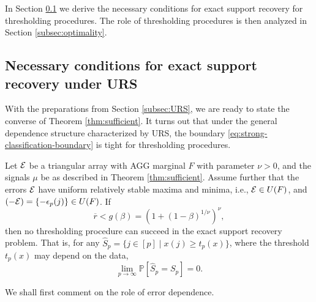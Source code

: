 
In Section \ref{subsec:necessary} we derive the necessary conditions for exact support recovery for thresholding procedures. 
The role of thresholding procedures is then analyzed in Section \ref{subsec:optimality}. 

\subsection{Necessary conditions for exact support recovery under URS}
\label{subsec:necessary}

With the preparations from Section \ref{subsec:URS}, we are ready to state the converse of Theorem \ref{thm:sufficient}.
It turns out that under the general dependence structure characterized by URS, the boundary \eqref{eq:strong-classification-boundary} is tight for thresholding procedures.

\begin{theorem} \label{thm:necessary}
    Let ${\cal E}$ be a triangular array with AGG marginal $F$ with parameter $\nu > 0$, and the signals $\mu$ be as described in Theorem \ref{thm:sufficient}. 
    Assume further that the errors ${\cal E}$ have uniform relatively stable maxima and minima, i.e., ${\cal E}\in U(F)$, and $(-{\cal E}) = \{-\epsilon_{p}(j)\} \in U(F)$.
    If 
    \begin{equation} \label{eq:signal-below-boundary}
        \overline{r} < g(\beta) = \left(1+(1-\beta)^{1/\nu}\right)^\nu,
    \end{equation}
    then no thresholding procedure can succeed in the exact support recovery problem.
    That is, for any $\widehat{S}_p = \{j\in[p]\;|\;x(j)\ge t_p(x)\}$, where the threshold $t_p(x)$ may depend on the data, 
    \begin{equation} \label{eq:classification-impossible-dependent}
        \lim_{p\to\infty}\mathbb P[\widehat{S}_p = S_p] = 0. 
    \end{equation}
\end{theorem}

We shall first comment on the role of error dependence.

